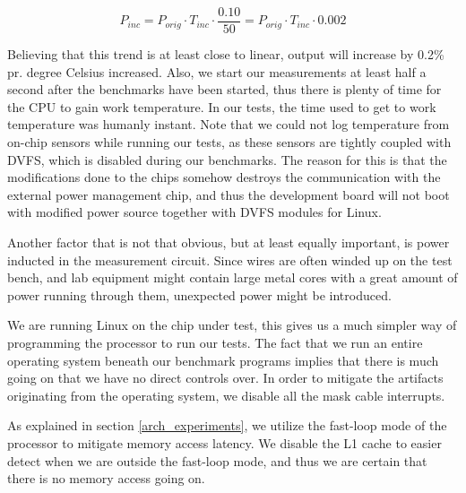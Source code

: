 \begin{equation}
    P_{inc} = P_{orig} \cdot T_{inc} \cdot \frac{0.10}{50} = P_{orig} \cdot T_{inc} \cdot 0.002
\end{equation}

Believing that this trend is at least close to linear, output will increase by
0.2\% pr.  degree Celsius increased. Also, we start our measurements at least
half a second after the benchmarks have been started, thus there is plenty of
time for the CPU to gain work temperature. In our tests, the time used to get to
work temperature was humanly instant. Note that we could not log temperature
from on-chip sensors while running our tests, as these sensors are tightly coupled
with DVFS, which is disabled during our benchmarks. The reason for this is that
the modifications done to the chips somehow destroys the communication with the external
power management chip, and thus the development board will not boot with modified
power source together with DVFS modules for Linux.

Another factor that is not that obvious, but at least equally important, is
power inducted in the measurement circuit. Since wires are often winded up on
the test bench, and lab equipment might contain large metal cores with a great
amount of power running through them, unexpected power might be introduced.

We are running Linux on the chip under test, this gives us a much simpler way of
programming the processor to run our tests. The fact that we run an entire
operating system beneath our benchmark programs implies that there is much going
on that we have no direct controls over.  In order to mitigate the artifacts
originating from the operating system, we disable all the mask cable interrupts.

As explained in section \ref{arch_experiments}, we utilize the fast-loop mode of
the processor to mitigate memory access latency. We disable the L1 cache to
easier detect when we are outside the fast-loop mode, and thus we are certain
that there is no memory access going on.
